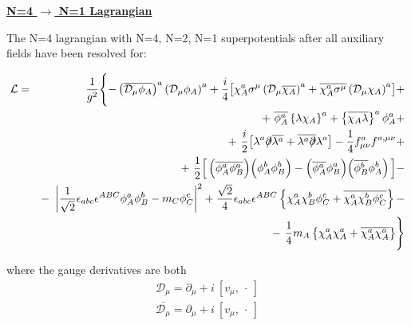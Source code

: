 \documentclass[14pt]{article}
\newcommand{\slashed}[1]{\hbox{{$#1$}\llap{$/$}}}
\begin{document}
\begin{center}
        {\Large\bf\underline{N=4 $\to$ N=1 Lagrangian}}
\end{center}

\vspace{1.5cm}
	The N=4 lagrangian with N=4, N=2, N=1 superpotentials after
	all auxiliary fields have been resolved for:

\begin{eqnarray*}
	{\mathcal L }& =& \frac{1}{g^2}
	\Biggl\{  - \left(\overline{{\mathcal D}_\mu \phi_A }\right)^a
		   \left({\mathcal D}_\mu \phi_A \right)^a     +
   	   \frac{i}{4} \bigl[ \chi_A^a\sigma^\mu
			\left({\mathcal D}_\mu\overline{\chi_A}\right)^a +
			\overline{\chi_A^a\sigma^\mu}
			\left({\mathcal D}_\mu\chi_A\right)^a  
		       \bigr]  + \\
&&
	   +~ \overline{\phi_A^a}\left\{\lambda\chi_A\right\}^a +
	   \left\{\overline{\chi_A\lambda}\right\}^a \phi_A^a + \\
%
&&	   +~ \frac{i}{2}\bigl[ \lambda^a\slashed\partial\overline{\lambda^a} +
			     \overline{\lambda^a\slashed\partial}
					\lambda^a \bigr]   - 
	   \frac{1}{4} f^a_{\mu\nu}f^{a,\mu\nu} + \\
&&	   + ~\frac{1}{2} \Bigl[\,
		\Bigl(\overline{\phi^a_A\phi^a_B}\Bigr)
		\Bigl(\phi^b_A\phi^b_B\Bigr)  -
		\Bigl(\overline{\phi^a_A}\phi^a_B\Bigr)
		\Bigl(\overline{\phi^b_B}\phi^b_A\Bigr)
			\,\Bigr] - \\
&&	   - ~\left| \frac{1}{\sqrt{2}}\epsilon_{abc}\epsilon^{ABC}
				\phi^a_A\phi^b_B  - m_C\phi^c_C \right|^2 +
	    \frac{\sqrt{2}}{4}\epsilon_{abc}\epsilon^{ABC}
		\left\{\chi_A^a\chi_B^b\phi_C^c 
			+ \overline{\chi_A^a\chi_B^b\phi_C^c}
		\right\} - \\
&&	   - ~\frac{1}{4} m_A 
		\left\{ \chi_A^a\chi_A^a + 
			\overline{\chi_A^a\chi_A^a} \right\}
	\Biggr\}  
\end{eqnarray*}

  	where the gauge derivatives are both
\begin{eqnarray*}
	{\mathcal D}_\mu = \partial_\mu + i~[ v_\mu, ~\cdot ~]	\\
	\overline{{\mathcal D}_\mu} = \partial_\mu + i~[ v_\mu, ~\cdot ~]
\end{eqnarray*}
\end{document}
